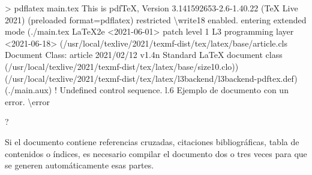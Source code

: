 \documentclass[
  letterpaper,
  DIV=11,
  numbers=noendperiod]{scrreport}
\newenvironment{Shaded}{\begin{snugshade}}{\end{snugshade}}
\newcommand{\DataTypeTok}[1]{\textcolor[rgb]{0.68,0.00,0.00}{#1}}
\newcommand{\ErrorTok}[1]{\textcolor[rgb]{0.68,0.00,0.00}{#1}}
\newcommand{\ExtensionTok}[1]{\textcolor[rgb]{0.00,0.23,0.31}{#1}}
\newcommand{\KeywordTok}[1]{\textcolor[rgb]{0.00,0.23,0.31}{#1}}
\newcommand{\NormalTok}[1]{\textcolor[rgb]{0.00,0.23,0.31}{#1}}
\newcommand{\OperatorTok}[1]{\textcolor[rgb]{0.37,0.37,0.37}{#1}}
\newcommand{\OtherTok}[1]{\textcolor[rgb]{0.00,0.23,0.31}{#1}}
\begin{document}
\begin{Shaded}
\begin{Highlighting}[]
\OperatorTok{\textgreater{}}\NormalTok{ pdflatex }\ExtensionTok{main.tex}
\ExtensionTok{This}\NormalTok{ is pdfTeX, Version 3.141592653{-}2.6{-}1.40.22 }\ErrorTok{(}\ExtensionTok{TeX}\NormalTok{ Live 2021}\KeywordTok{)} \KeywordTok{(}\ExtensionTok{preloaded}\NormalTok{ format=pdflatex}\KeywordTok{)}
 \ExtensionTok{restricted} \DataTypeTok{\textbackslash{}w}\NormalTok{rite18 enabled.}
\ExtensionTok{entering}\NormalTok{ extended mode}
\KeywordTok{(}\ExtensionTok{./main.tex}
\ExtensionTok{LaTeX2e} \OperatorTok{\textless{}}\NormalTok{2021{-}06{-}01}\OperatorTok{\textgreater{}}\NormalTok{ patch level 1}
\ExtensionTok{L3}\NormalTok{ programming layer }\OperatorTok{\textless{}}\NormalTok{2021{-}06{-}18}\OperatorTok{\textgreater{}}
\KeywordTok{(}\ExtensionTok{/usr/local/texlive/2021/texmf{-}dist/tex/latex/base/article.cls}
\ExtensionTok{Document}\NormalTok{ Class: article 2021/02/12 v1.4n Standard LaTeX document class}
\KeywordTok{(}\ExtensionTok{/usr/local/texlive/2021/texmf{-}dist/tex/latex/base/size10.clo}\KeywordTok{))}
\KeywordTok{(}\ExtensionTok{/usr/local/texlive/2021/texmf{-}dist/tex/latex/l3backend/l3backend{-}pdftex.def}\KeywordTok{)}
\KeywordTok{(}\ExtensionTok{./main.aux}\KeywordTok{)}
\OtherTok{! }\ExtensionTok{Undefined}\NormalTok{ control sequence.}
\ExtensionTok{l.6}\NormalTok{ Ejemplo de documento con un error. }\DataTypeTok{\textbackslash{}e}\NormalTok{rror}
                                             
\ExtensionTok{?} 
\end{Highlighting}
\end{Shaded}

\begin{tcolorbox}[enhanced jigsaw, opacitybacktitle=0.6, coltitle=black, colbacktitle=quarto-callout-warning-color!10!white, title=\textcolor{quarto-callout-warning-color}{\faExclamationTriangle}\hspace{0.5em}{Advertencia}, colback=white, toprule=.15mm, breakable, opacityback=0, left=2mm, rightrule=.15mm, toptitle=1mm, colframe=quarto-callout-warning-color-frame, bottomtitle=1mm, titlerule=0mm, arc=.35mm, bottomrule=.15mm, leftrule=.75mm]
Si el documento contiene referencias cruzadas, citaciones
bibliográficas, tabla de contenidos o índices, es necesario compilar el
documento dos o tres veces para que se generen automáticamente esas
partes.
\end{tcolorbox}

\end{document}
